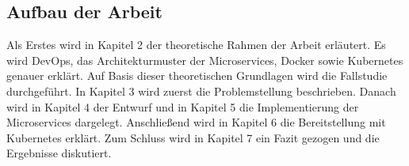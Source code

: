 \subsection{Aufbau der Arbeit}

Als Erstes wird in Kapitel 2 der theoretische Rahmen der Arbeit erläutert. Es wird DevOps, das Architekturmuster der Microservices, Docker sowie Kubernetes genauer erklärt. Auf Basis dieser theoretischen Grundlagen wird die Fallstudie durchgeführt. In Kapitel 3 wird zuerst die Problemstellung beschrieben. Danach wird in Kapitel 4 der Entwurf und in Kapitel 5 die Implementierung der Microservices dargelegt. Anschließend wird in Kapitel 6 die Bereitstellung mit Kubernetes erklärt. Zum Schluss wird in Kapitel 7 ein Fazit gezogen und die Ergebnisse diskutiert.


